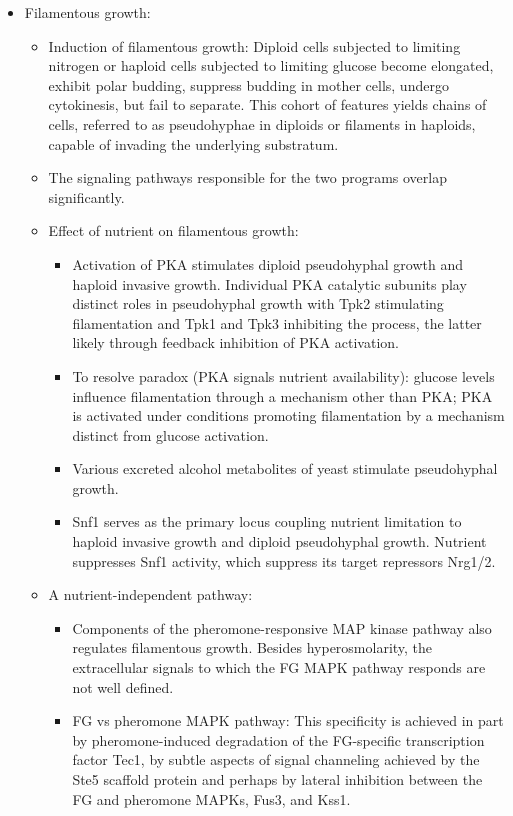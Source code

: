 \documentclass{report}
\begin{document}
\begin{itemize}
\item Filamentous growth: 
\begin{itemize}
	\item Induction of filamentous growth: Diploid cells subjected to limiting nitrogen or haploid cells subjected to limiting glucose become elongated, exhibit polar budding, suppress budding in mother cells, undergo cytokinesis, but fail to separate. This cohort of features yields chains of cells, referred to as pseudohyphae in diploids or filaments in haploids, capable of invading the underlying substratum.
	
	\item The signaling pathways responsible for the two programs overlap significantly. 
	
	\item Effect of nutrient on filamentous growth: 
	\begin{itemize}
		\item Activation of PKA stimulates diploid pseudohyphal growth and haploid invasive growth. Individual PKA catalytic subunits play distinct roles in pseudohyphal growth with Tpk2 stimulating filamentation and Tpk1 and Tpk3 inhibiting the process, the latter likely through feedback inhibition of PKA activation.
		\item To resolve paradox (PKA signals nutrient availability): glucose levels influence filamentation through a mechanism other than PKA; PKA is activated under conditions promoting filamentation by a mechanism distinct from glucose activation.
		\item Various excreted alcohol metabolites of yeast stimulate pseudohyphal growth.
		\item Snf1 serves as the primary locus coupling nutrient limitation to haploid invasive growth and diploid pseudohyphal growth. Nutrient suppresses Snf1 activity, which suppress its target repressors Nrg1/2. 
	\end{itemize}
	
	\item A nutrient-independent pathway: 
	\begin{itemize}
		\item Components of the pheromone-responsive MAP kinase pathway also regulates filamentous growth. Besides hyperosmolarity, the extracellular signals to which the FG MAPK pathway responds are not well defined. 
		\item FG vs pheromone MAPK pathway: This specificity is achieved in part by pheromone-induced degradation of the FG-specific transcription factor Tec1, by subtle aspects of signal channeling achieved by the Ste5 scaffold protein and perhaps by lateral inhibition between the FG and pheromone MAPKs, Fus3, and Kss1. 
	\end{itemize}
	

\end{itemize}
\end{itemize}
\end{document}
